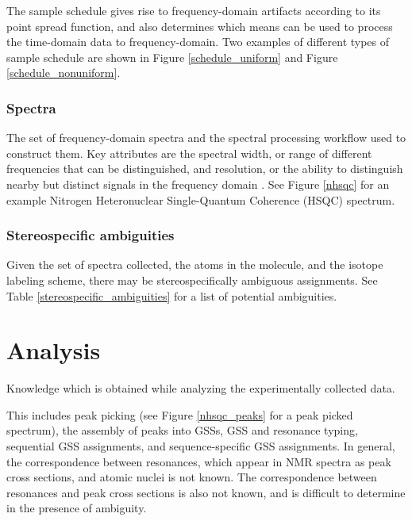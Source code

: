 The sample schedule gives rise to frequency-domain artifacts according to 
its point spread function, and also determines which means can be used to
process the time-domain data to frequency-domain.  Two examples of different
types of sample schedule are shown in Figure \ref{schedule_uniform} and
Figure \ref{schedule_nonuniform}.

\subsubsection{Spectra}
The set of frequency-domain spectra and the spectral processing workflow
used to construct them.  Key attributes are the spectral width, or range of
different frequencies that can be distinguished, and resolution, or the
ability to distinguish nearby but distinct signals in the frequency domain
\cite{ernst2004}.  See Figure \ref{nhsqc} for an example Nitrogen 
Heteronuclear Single-Quantum Coherence (HSQC) spectrum.

\subsubsection{Stereospecific ambiguities}
Given the set of spectra collected, the atoms in the molecule, and the isotope
labeling scheme, there may be stereospecifically ambiguous assignments.  See
Table \ref{stereospecific_ambiguities} for a list of potential ambiguities.



\section{Analysis}
Knowledge which is obtained while analyzing the experimentally collected data.

This includes peak picking (see Figure \ref{nhsqc_peaks} for a peak picked spectrum), 
the assembly of peaks into GSSs, GSS and resonance typing, sequential
GSS assignments, and sequence-specific GSS assignments.
In general, the correspondence between resonances, which appear in NMR spectra 
as peak cross sections, and atomic nuclei is not known.  The correspondence 
between resonances and peak cross sections is also not known, and is difficult 
to determine in the presence of ambiguity.

